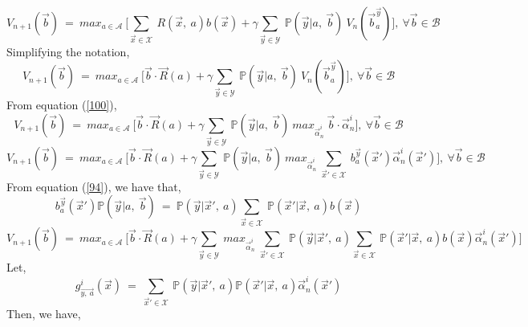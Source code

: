 \documentclass[12pt, draftcls, onecolumn]{IEEEtran}
\begin{document}
\begin{itemize}
    \begin{equation*}
        V_{n+1}(\vec{b})\ =\ max_{a \in \mathcal{A}}\ \Big[\sum_{\vec{x} \in \mathcal{X}}\ R(\vec{x},\ a)b(\vec{x}) + \gamma \sum_{\vec{y} \in \mathcal{Y}}\ \mathbb{P}(\vec{y}|a,\ \vec{b})\ V_n(\vec{b}_a^{\vec{y}})\Big],\ \forall \vec{b} \in \mathcal{B}
    \end{equation*}
    Simplifying the notation,
    \begin{equation*}
        V_{n+1}(\vec{b})\ =\ max_{a \in \mathcal{A}}\ \Big[\vec{b} \cdot \vec{R}(a) + \gamma \sum_{\vec{y} \in \mathcal{Y}}\ \mathbb{P}(\vec{y}|a,\ \vec{b})\ V_n(\vec{b}_a^{\vec{y}})\Big],\ \forall \vec{b} \in \mathcal{B}
    \end{equation*}
    From equation (\ref{100}),
    \begin{equation*}
        V_{n+1}(\vec{b})\ =\ max_{a \in \mathcal{A}}\ \Big[\vec{b} \cdot \vec{R}(a) + \gamma \sum_{\vec{y} \in \mathcal{Y}}\ \mathbb{P}(\vec{y}|a,\ \vec{b})\ max_{\vec{\alpha}^i_n}\ \vec{b} \cdot \vec{\alpha}^i_n\Big],\ \forall \vec{b} \in \mathcal{B}
    \end{equation*}
    \begin{equation*}
        V_{n+1}(\vec{b})\ =\ max_{a \in \mathcal{A}}\ \Big[\vec{b} \cdot \vec{R}(a) + \gamma \sum_{\vec{y} \in \mathcal{Y}}\ \mathbb{P}(\vec{y}|a,\ \vec{b})\ max_{\vec{\alpha}^i_n}\ \sum_{\vec{x}' \in \mathcal{X}}\ b_a^{\vec{y}}(\vec{x}')\vec{\alpha}_n^i(\vec{x}')\Big],\ \forall \vec{b} \in \mathcal{B}
    \end{equation*}
    From equation (\ref{94}), we have that,
    \begin{equation*}
        b_a^{\vec{y}}(\vec{x}')\mathbb{P}(\vec{y}|a,\ \vec{b})\ =\ \mathbb{P}(\vec{y}|\vec{x}',\ a)\sum_{\vec{x} \in \mathcal{X}}\ \mathbb{P}(\vec{x}'|\vec{x},\ a)b(\vec{x})
    \end{equation*}
    \begin{equation*}
            V_{n+1}(\vec{b})\ =\ max_{a \in \mathcal{A}}\ \Big[\vec{b} \cdot \vec{R}(a) + \gamma \sum_{\vec{y} \in \mathcal{Y}}\ max_{\vec{\alpha}^i_n}\ \sum_{\vec{x}' \in \mathcal{X}}\ \mathbb{P}(\vec{y}|\vec{x}',\ a)\sum_{\vec{x} \in \mathcal{X}}\ \mathbb{P}(\vec{x}'|\vec{x},\ a)b(\vec{x})\vec{\alpha}_n^i(\vec{x}')\Big]
    \end{equation*}
    Let,
    \[g_{\vec{y,\ a}}^i(\vec{x})\ =\ \sum_{\vec{x}' \in \mathcal{X}}\ \mathbb{P}(\vec{y}|\vec{x}',\ a)\mathbb{P}(\vec{x}'|\vec{x},\ a)\vec{\alpha}_n^i(\vec{x}')\]
    Then, we have,
    \begin{equation*}

\end{equation*}
\end{itemize}
\end{document}
